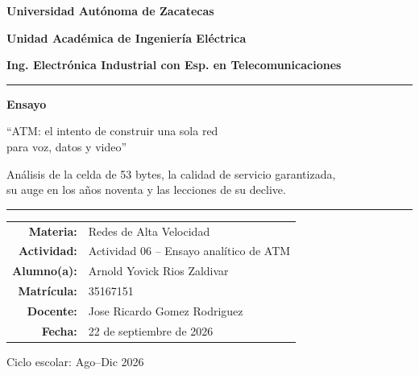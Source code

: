 \documentclass[12pt,a4paper]{article}
\begin{document}
\begin{titlepage}
    \centering
    \vspace*{1cm}
    {\Large\bfseries Universidad Autónoma de Zacatecas\par}
    \vspace{0.4cm}
    {\large\bfseries Unidad Académica de Ingeniería Eléctrica\par}
    {\large\bfseries Ing. Electrónica Industrial con Esp. en Telecomunicaciones\par}
    \vspace{1.5cm}
    \noindent\rule{\textwidth}{0.8pt}
    \vspace{1cm}
    {\huge\bfseries Ensayo\par}
    \vspace{0.7cm}
    {\Large ``ATM: el intento de construir una sola red \\ para voz, datos y video''\par}
    \vspace{0.6cm}
    {\normalsize Análisis de la celda de 53 bytes, la calidad de servicio garantizada, \\ su auge en los años noventa y las lecciones de su declive.\par}
    \vspace{1cm}
    \noindent\rule{\textwidth}{0.8pt}
    \vspace{1.8cm}

    \begin{tabular}{r l}
        \textbf{Materia:}    & Redes de Alta Velocidad \\[0.35cm]
        \textbf{Actividad:}  & Actividad 06 -- Ensayo analítico de ATM \\[0.35cm]
        \textbf{Alumno(a):}  & Arnold Yovick Rios Zaldivar \\[0.35cm]
        \textbf{Matrícula:}  & 35167151 \\[0.35cm]
        \textbf{Docente:}    & Jose Ricardo Gomez Rodriguez \\[0.35cm]
        \textbf{Fecha:}      & 22 de septiembre de 2026
    \end{tabular}

    \vfill
    Ciclo escolar: Ago--Dic 2026
    \vspace*{0.5cm}
\end{titlepage}
\setcounter{page}{1}

\end{document}
